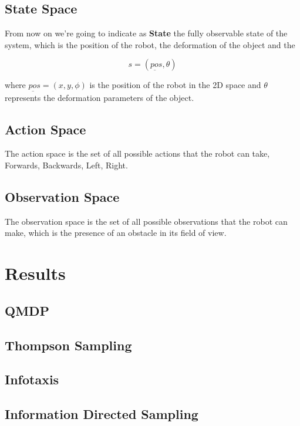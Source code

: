 \documentclass[12pt,a4paper]{article}
\begin{document}
\subsection{State Space}
From now on we're going to indicate as \textbf{State} the fully observable state of the 
system, which is the position of the robot, the deformation of the object and the

$$s = (\underbar{pos},\theta)$$

where $\underbar{pos} = (x,y,\phi)$ is the position of the robot in the 2D space
and $\theta$ represents the deformation parameters of the object.

\subsection{Action Space}
The action space is the set of all possible actions that the robot can take, 
Forwards, Backwards, Left, Right.
\subsection{Observation Space}
The observation space is the set of all possible observations that the robot can make,
which is the presence of an obstacle in its field of view.
\newpage
\section{Results}
\subsection{QMDP}
\subsection{Thompson Sampling}
\subsection{Infotaxis}
\subsection{Information Directed Sampling}
\cite{russo2017learningoptimizeinformationdirectedsampling}




\newpage


\end{document}
